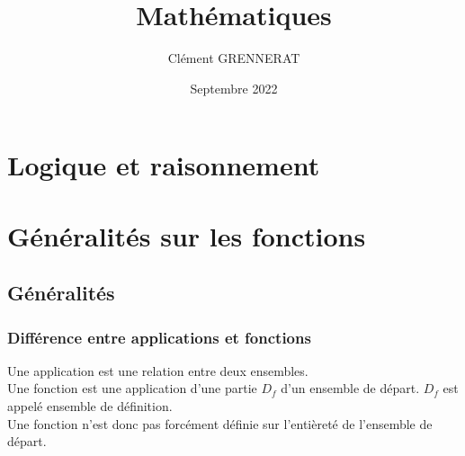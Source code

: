 \documentclass[13pt, twoside, a4paper, french]{report}
\newcommand*{\getSubject}{Mathématiques}
\begin{document}
\title{\getSubject}
\author{Clément GRENNERAT}
\date{Septembre 2022}


\chapter{Logique et raisonnement}\label{ch:logique-et-raisonnement}
  


\chapter{Généralités sur les fonctions}\label{ch:generalites-sur-les-fonctions}
  
  
  \section{Généralités}\label{sec:generalites}
    
    \subsection{Différence entre applications et fonctions}\label{subsec:difference-entre-applications-et-fonctions}
      
      Une application est une relation entre deux ensembles.\\
      Une fonction est une application d'une partie $D_f$ d'un ensemble de départ. $D_f$ est appelé ensemble de définition.\\
      Une fonction n'est donc pas forcément définie sur l'entièreté de l'ensemble de départ.
      
      \vspace*{7pt}
      
\end{document}
